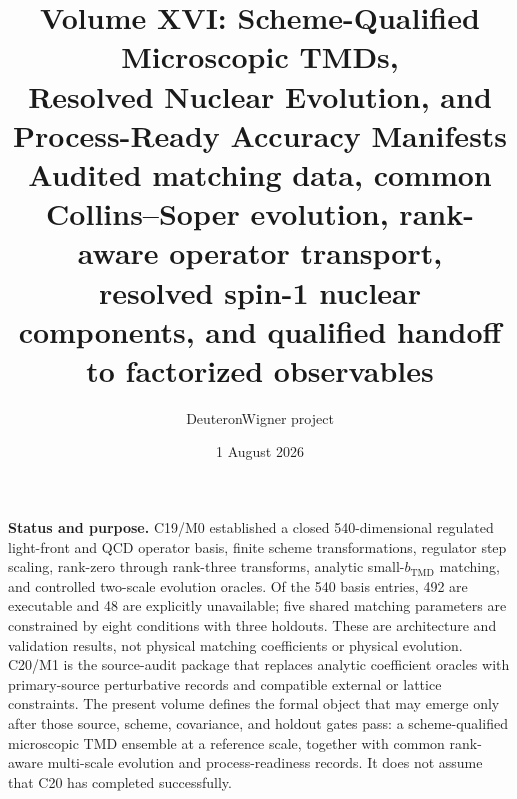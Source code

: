 \documentclass[11pt]{article}
\title{\vspace{-1.0cm}
{\color{navy}\bfseries Volume XVI: Scheme-Qualified Microscopic TMDs,\\[2mm]
Resolved Nuclear Evolution, and Process-Ready Accuracy Manifests}\\[4mm]
\large Audited matching data, common Collins--Soper evolution, rank-aware operator transport,\\
resolved spin-1 nuclear components, and qualified handoff to factorized observables}
\author{DeuteronWigner project}
\date{1 August 2026}
\begin{document}
\maketitle

\begin{center}
\begin{minipage}{0.94\textwidth}
\colorbox{softblue}{\parbox{0.96\textwidth}{
\textbf{Status and purpose.}
C19/M0 established a closed 540-dimensional regulated light-front and QCD operator basis, finite scheme transformations, regulator step scaling, rank-zero through rank-three transforms, analytic small-\(b_{\mathrm{TMD}}\) matching, and controlled two-scale evolution oracles.  Of the 540 basis entries, 492 are executable and 48 are explicitly unavailable; five shared matching parameters are constrained by eight conditions with three holdouts.  These are architecture and validation results, not physical matching coefficients or physical evolution.  C20/M1 is the source-audit package that replaces analytic coefficient oracles with primary-source perturbative records and compatible external or lattice constraints.  The present volume defines the formal object that may emerge only after those source, scheme, covariance, and holdout gates pass: a scheme-qualified microscopic TMD ensemble at a reference scale, together with common rank-aware multi-scale evolution and process-readiness records.  It does not assume that C20 has completed successfully.
}}
\end{minipage}
\end{center}
\end{document}
